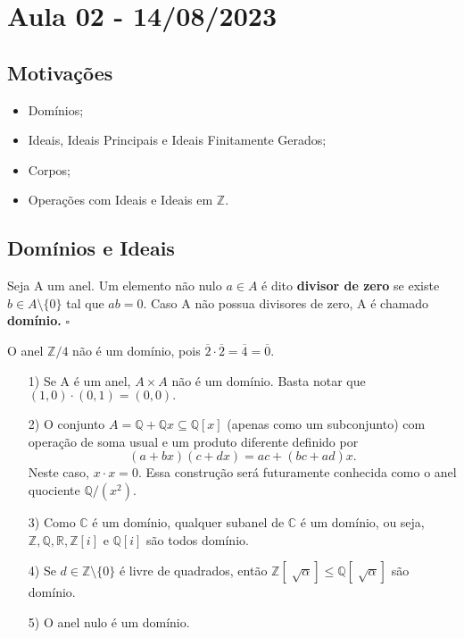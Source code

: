 \documentclass[algebraII_notes.tex]{subfiles}
\begin{document}
\section{Aula 02 - 14/08/2023}
\subsection{Motivações}
\begin{itemize}
	\item Domínios;
	\item Ideais, Ideais Principais e Ideais Finitamente Gerados;
	\item Corpos;
	\item Operações com Ideais e Ideais em \(\mathbb{Z}\).
\end{itemize}
\subsection{Domínios e Ideais}
\begin{def*}
	Seja A um anel. Um elemento não nulo \(a\in A\) é dito \textbf{divisor de zero} se existe \(b\in A\setminus{\{0\}}\) tal que
	\(ab = 0.\) Caso A não possua divisores de zero, A é chamado \textbf{domínio.} \(\square\)
\end{def*}
\begin{example}
	O anel \(\mathbb{Z}/4\) não é um domínio, pois \(\overline{2}\cdot \overline{2} = \overline{4} = \overline{0}.\)
\end{example}
\begin{example}
	\begin{itemize}
		\item[1)] Se A é um anel, \(A\times A\) não é um domínio. Basta notar que \((1, 0)\cdot (0, 1) = (0, 0).\)
		\item[2)] O conjunto \(A = \mathbb{Q} + \mathbb{Q}x \subseteq{\mathbb{Q}[x]}\) (apenas como um subconjunto) com operação de soma usual e um
		      produto diferente definido por
		      \[
			      (a+bx)(c+dx) = ac + (bc+ad)x.
		      \]
		      Neste caso, \(x \cdot x = 0.\) Essa construção será futuramente conhecida como o anel quociente \(\mathbb{Q}/(x^{2}).\)
		\item[3)] Como \(\mathbb{C}\) é um domínio, qualquer subanel de \(\mathbb{C}\) é um domínio, ou seja, \(\mathbb{Z}, \mathbb{Q}, \mathbb{R}, \mathbb{Z}[i]\) e \(\mathbb{Q}[i]\)
		      são todos domínio.
		\item[4)] Se \(d\in \mathbb{Z}\setminus{\{0\}}\) é livre de quadrados, então \(\mathbb{Z}[\sqrt[]{\alpha }]\leq \mathbb{Q}[\sqrt[]{\alpha }] \) são domínio.
		\item[5)] O anel nulo é um domínio.
	\end{itemize}
\end{example}
\end{document}
